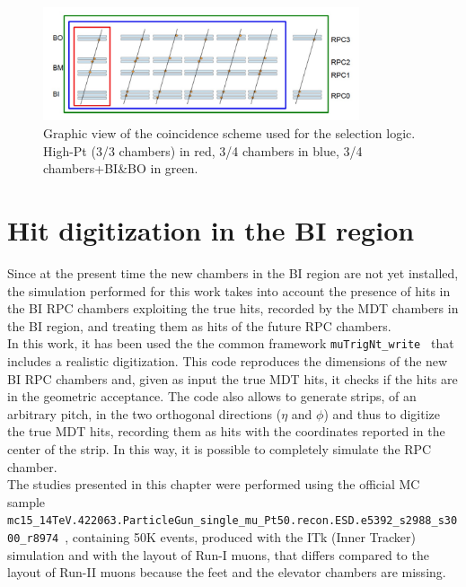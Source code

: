 \begin{figure}[!h]
	\centering
	\includegraphics[width=0.83\textwidth]{Chapters/CH3/figures/trig_scheme}
	\caption{Graphic view of the coincidence scheme used for the selection logic. High-Pt (3/3 chambers) in red, 3/4 chambers in blue, 3/4 chambers+BI\&BO in green.}
	\label{fig:trig_scheme}
\end{figure}

\section{Hit digitization in the BI region}
\label{sec:hit_dig}
Since at the present time the new chambers in the BI region are not yet installed,
the simulation performed for this work takes into account the presence 
of hits in the BI RPC chambers exploiting the true hits, recorded 
by the MDT chambers in the BI region, and treating them as hits of the future RPC chambers.\\
In this work, it has been used the the common framework \texttt{muTrigNt\_write}~\cite{muTrigNt} that includes a realistic digitization.
This code reproduces the dimensions of the new BI RPC chambers and, 
given as input the true MDT hits, it checks if the hits are in the geometric 
acceptance.
The code also allows to generate strips, of an arbitrary pitch, in the two orthogonal directions ($\eta$ and $\phi$) and thus to digitize the true MDT hits, recording them as hits with the coordinates reported in the center of the strip.
In this way, it is possible to completely simulate the RPC chamber. \\
The studies presented in this chapter were performed using the official MC sample\\  {\scriptsize\texttt{mc15\_14TeV.422063.ParticleGun\_single\_mu\_Pt50.recon.ESD.e5392\_s2988\_s3000\_r8974}}~\cite{Muontwiki}, containing 50K events, produced with the ITk (Inner Tracker) simulation and with the layout of Run-I muons, that differs compared to the layout of Run-II muons because the feet and the elevator chambers are missing.
